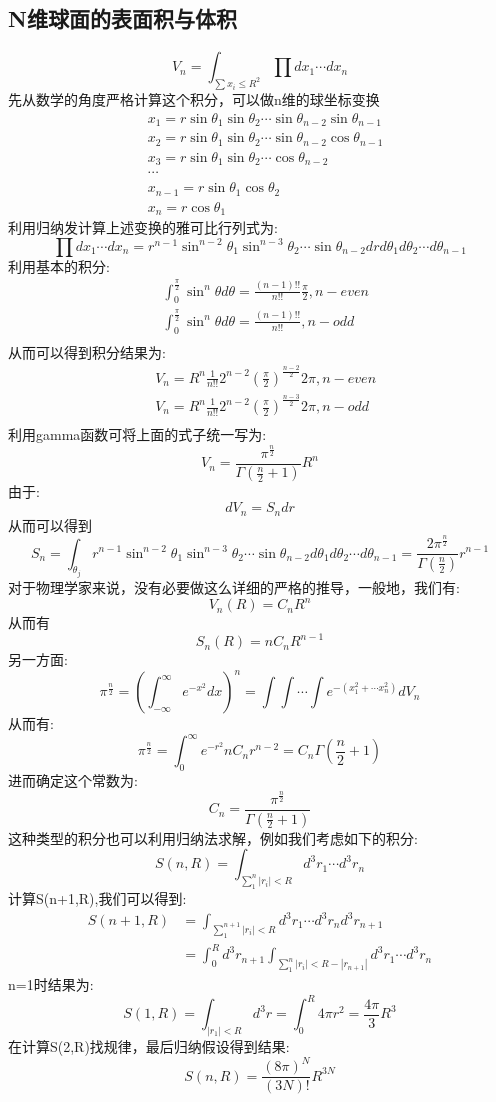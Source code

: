 \subsection{N维球面的表面积与体积}
\begin{equation}
V_n=\int_{\sum x_i\leq R^2} \prod dx_1\cdots dx_n
\end{equation}
先从数学的角度严格计算这个积分，可以做n维的球坐标变换
\begin{align*}
&x_1=r\sin\theta_1\sin\theta_2\cdots \sin\theta_{n-2}\sin\theta_{n-1}\\
&x_2=r\sin\theta_1\sin\theta_2\cdots \sin\theta_{n-2}\cos\theta_{n-1}\\
&x_3=r\sin\theta_1\sin\theta_2\cdots \cos\theta_{n-2}\\
&\cdots\\
&x_{n-1}=r\sin\theta_1\cos\theta_2\\
&x_{n}=r\cos\theta_1
\end{align*}
利用归纳发计算上述变换的雅可比行列式为:
\[\prod dx_1\cdots dx_n=r^{n-1}\sin^{n-2}\theta_1\sin^{n-3}\theta_2\cdots \sin\theta_{n-2} drd\theta_1 d\theta_2\cdots d\theta_{n-1}\]
利用基本的积分:
\begin{align*}
&\int_{0}^{\frac{\pi}{2}} \sin^n\theta d\theta=\frac{(n-1)!!}{n!!}\frac{\pi}{2}, n-even\\
&\int_{0}^{\frac{\pi}{2}} \sin^n\theta d\theta=\frac{(n-1)!!}{n!!}, n-odd\\
\end{align*}
从而可以得到积分结果为:
\begin{align*}
&V_n=R^n\frac{1}{n!!}2^{n-2}(\frac{\pi}{2})^{\frac{n-2}{2}} 2\pi , n-even\\
&V_n=R^n\frac{1}{n!!}2^{n-2}(\frac{\pi}{2})^{\frac{n-3}{2}} 2\pi , n-odd\\
\end{align*}
利用gamma函数可将上面的式子统一写为:
\[V_n=\frac{\pi^{\frac{n}{2}}}{\Gamma(\frac{n}{2}+1)}R^n\]
由于:
\[dV_n=S_{n}dr\]
从而可以得到
\[S_{n}=\int_{\theta_j}r^{n-1}\sin^{n-2}\theta_1\sin^{n-3}\theta_2\cdots \sin\theta_{n-2} d\theta_1 d\theta_2\cdots d\theta_{n-1}=\frac{2\pi^{\frac{n}{2}}}{\Gamma(\frac{n}{2})}r^{n-1}\]
对于物理学家来说，没有必要做这么详细的严格的推导，一般地，我们有:
\[V_n(R)=C_nR^n\]
从而有
\[S_n(R)=nC_nR^{n-1}\]
另一方面:
\[\pi^{\frac{n}{2}}=(\int_{-\infty}^{\infty}e^{-x^2}dx)^n=\int\int\cdots\int e^{-(x_1^2+\cdots x_n^2)}dV_n\]
从而有:
\[\pi^{\frac{n}{2}}=\int_0^\infty e^{-r^2}nC_n r^{n-2}=C_n\Gamma(\frac{n}{2}+1)\]
进而确定这个常数为:
\[C_n=\frac{\pi^{\frac{n}{2}}}{\Gamma(\frac{n}{2}+1)}\]
这种类型的积分也可以利用归纳法求解，例如我们考虑如下的积分:
\[S(n,R)=\int_{\sum_{1}^n |r_i|<R}d^3r_1\cdots d^3r_n\]
计算S(n+1,R),我们可以得到:
\begin{align*}
S(n+1,R)&=\int_{\sum_{1}^{n+1} |r_i|<R}d^3r_1\cdots d^3r_nd^3r_{n+1}\\
&=\int_0^Rd^3r_{n+1} \int_{\sum_{1}^n |r_i|<R-|r_{n+1}|}d^3r_1\cdots d^3r_n
\end{align*}
n=1时结果为:
\[S(1,R)=\int_{|r_1|<R}d^3r=\int_0^R 4\pi r^2=\frac{4\pi}{3}R^3\]
在计算S(2,R)找规律，最后归纳假设得到结果:
\[S(n,R)=\frac{(8\pi)^N}{(3N)!}R^{3N}\]
